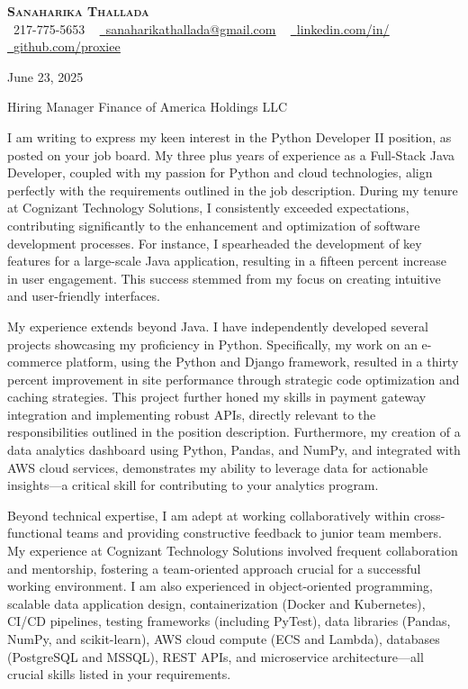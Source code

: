 \documentclass[letterpaper,11pt]{article}
\begin{document}
\begin{center}
    \textbf{\Huge \scshape {\fontsize{15pt}{20pt}\selectfont Sanaharika Thallada}} \\ \vspace{1pt}
    \small \raisebox{-0.1\height}\faPhone\ 217-775-5653 ~ \href{mailto:sanaharikathallada@gmail.com}{\raisebox{-0.2\height}\faEnvelope\  \underline{sanaharikathallada@gmail.com}} ~
    \href{https://www.linkedin.com/in/yashwanthtirupati/}{\raisebox{-0.2\height}\faLinkedin\ \underline{linkedin.com/in/}} ~
    \href{https://github.com/proxiee}{\raisebox{-0.2\height}\faGithub\ \underline{github.com/proxiee}}
\end{center}
\vspace{0.5cm}

June 23, 2025

Hiring Manager
Finance of America Holdings LLC


I am writing to express my keen interest in the Python Developer II position, as posted on your job board.  My three plus years of experience as a Full-Stack Java Developer, coupled with my passion for Python and cloud technologies, align perfectly with the requirements outlined in the job description.  During my tenure at Cognizant Technology Solutions, I consistently exceeded expectations, contributing significantly to the enhancement and optimization of software development processes. For instance, I spearheaded the development of key features for a large-scale Java application, resulting in a fifteen percent increase in user engagement.  This success stemmed from my focus on creating intuitive and user-friendly interfaces.


My experience extends beyond Java.  I have independently developed several projects showcasing my proficiency in Python.  Specifically, my work on an e-commerce platform, using the Python and Django framework, resulted in a thirty percent improvement in site performance through strategic code optimization and caching strategies. This project further honed my skills in payment gateway integration and implementing robust APIs, directly relevant to the responsibilities outlined in the position description.  Furthermore, my creation of a data analytics dashboard using Python, Pandas, and NumPy, and integrated with AWS cloud services, demonstrates my ability to leverage data for actionable insights—a critical skill for contributing to your analytics program.


Beyond technical expertise, I am adept at working collaboratively within cross-functional teams and providing constructive feedback to junior team members. My experience at Cognizant Technology Solutions involved frequent collaboration and mentorship, fostering a team-oriented approach crucial for a successful working environment.  I am also experienced in object-oriented programming, scalable data application design, containerization (Docker and Kubernetes), CI/CD pipelines, testing frameworks (including PyTest), data libraries (Pandas, NumPy, and scikit-learn), AWS cloud compute (ECS and Lambda), databases (PostgreSQL and MSSQL), REST APIs, and microservice architecture—all crucial skills listed in your requirements.
\end{document}
